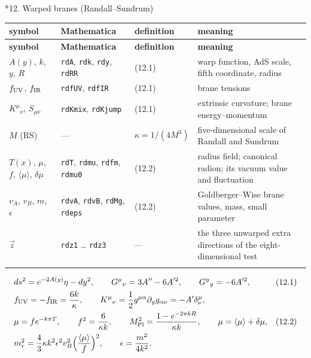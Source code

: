 \documentclass[10pt,a4paper]{article}
\makeatletter
\renewcommand\section{\@startsection{section}{1}{\z@}{-3.5ex \@plus -1ex \@minus -.2ex}{2.3ex \@plus.2ex}{\normalfont\Large\bfseries\raggedright}}
\makeatother
\begin{document}
\section*{12. Warped branes (Randall–Sundrum)}
{\footnotesize
\begin{longtable}{>{\raggedright\arraybackslash}p{}>{\raggedright\arraybackslash}p{}>{\raggedright\arraybackslash}p{}>{\raggedright\arraybackslash}p{}}
\toprule
\textbf{symbol} & \textbf{Mathematica} & \textbf{definition} & \textbf{meaning} \\
\midrule\endfirsthead
\toprule
\textbf{symbol} & \textbf{Mathematica} & \textbf{definition} & \textbf{meaning} \\
\midrule\endhead
\endfoot
\bottomrule\endlastfoot
$A(y)$, $k$, $y$, $R$ & \texttt{rdA}, \texttt{rdk}, \texttt{rdy}, \texttt{rdRR} & (12.1) & warp function, AdS scale, fifth coordinate, radius \\
$f_{\rm UV}$, $f_{\rm IR}$ & \texttt{rdfUV}, \texttt{rdfIR} & (12.1) & brane tensions \\
$K^\mu{}_\nu$, $S_{\mu\nu}$ & \texttt{rdKmix}, \texttt{rdKjump} & (12.1) & extrinsic curvature; brane energy–momentum \\
$M$ (RS) & — & $\kappa=1/(4M^3)$ & five-dimensional scale of Randall and Sundrum \\
$T(x)$, $\mu$, $f$, $\langle\mu\rangle$, $\delta\mu$ & \texttt{rdT}, \texttt{rdmu}, \texttt{rdfm}, \texttt{rdmu0} & (12.2) & radius field; canonical radion; its vacuum value and fluctuation \\
$v_A$, $v_B$, $m$, $\epsilon$ & \texttt{rdvA}, \texttt{rdvB}, \texttt{rdMg}, \texttt{rdeps} & (12.2) & Goldberger–Wise brane values, mass, small parameter \\
$\vec z$ & \texttt{rdz1} … \texttt{rdz3} & — & the three unwarped extra directions of the eight-dimensional test \\*
\end{longtable}}
\begin{align*}
&ds^2=e^{-2A(y)}\eta-dy^2,\qquad G^\mu{}_\nu=3A''-6A'^2,\qquad G^y{}_y=-6A'^2,&&(12.1) \\
&f_{\rm UV}=-f_{\rm IR}=\frac{6k}\kappa,\qquad K^\mu{}_\nu=\frac12g^{\mu\alpha}\partial_yg_{\alpha\nu}=-A'\delta^\mu_\nu, \\
&\mu=fe^{-k\pi T},\qquad f^2=\frac6{\kappa k},\qquad M_{\rm Pl}^2=\frac{1-e^{-2\pi kR}}{\kappa k},\qquad \mu=\langle\mu\rangle+\delta\mu,&&(12.2) \\
&m_r^2=\frac43\kappa k^2\epsilon^2v_B^2\Big(\frac{\langle\mu\rangle}f\Big)^2,\qquad \epsilon=\frac{m^2}{4k^2}.
\end{align*}
\end{document}
